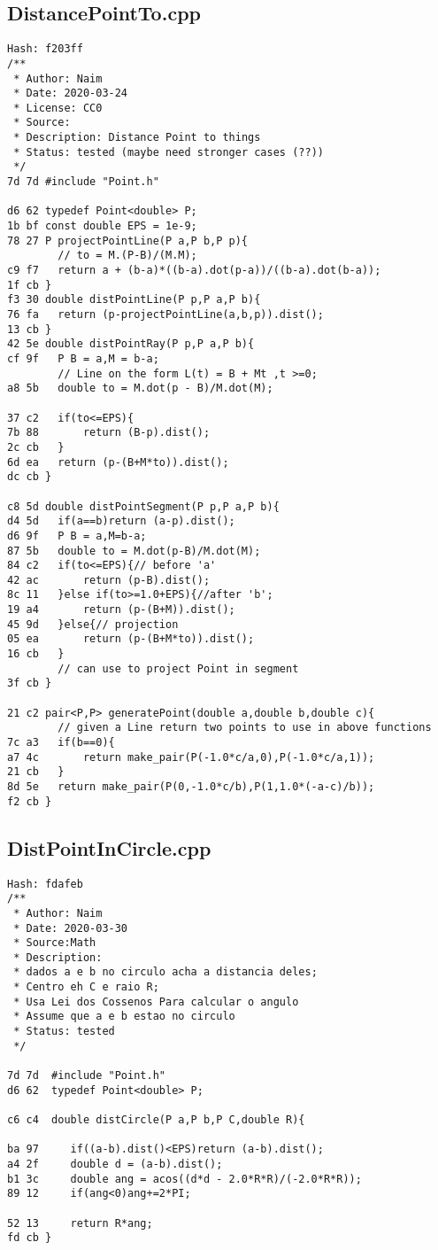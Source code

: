 \documentclass[11pt, a4paper, twoside]{article}
\begin{document}
\subsection{DistancePointTo.cpp}
\begin{lstlisting}
Hash: f203ff
/**
 * Author: Naim
 * Date: 2020-03-24
 * License: CC0
 * Source:
 * Description: Distance Point to things
 * Status: tested (maybe need stronger cases (??))
 */
7d 7d #include "Point.h"

d6 62 typedef Point<double> P;
1b bf const double EPS = 1e-9;
78 27 P projectPointLine(P a,P b,P p){
      	// to = M.(P-B)/(M.M);
c9 f7 	return a + (b-a)*((b-a).dot(p-a))/((b-a).dot(b-a));
1f cb }
f3 30 double distPointLine(P p,P a,P b){
76 fa 	return (p-projectPointLine(a,b,p)).dist();
13 cb }
42 5e double distPointRay(P p,P a,P b){
cf 9f 	P B = a,M = b-a;
      	// Line on the form L(t) = B + Mt ,t >=0;
a8 5b 	double to = M.dot(p - B)/M.dot(M);
      	
37 c2 	if(to<=EPS){
7b 88 		return (B-p).dist();
2c cb 	}
6d ea 	return (p-(B+M*to)).dist();
dc cb }

c8 5d double distPointSegment(P p,P a,P b){
d4 5d 	if(a==b)return (a-p).dist();
d6 9f 	P B = a,M=b-a;
87 5b 	double to = M.dot(p-B)/M.dot(M);
84 c2 	if(to<=EPS){// before 'a'
42 ac 		return (p-B).dist();
8c 11 	}else if(to>=1.0+EPS){//after 'b'; 
19 a4 		return (p-(B+M)).dist();
45 9d 	}else{// projection
05 ea 		return (p-(B+M*to)).dist();
16 cb 	}
      	// can use to project Point in segment
3f cb }

21 c2 pair<P,P> generatePoint(double a,double b,double c){
        // given a Line return two points to use in above functions
7c a3 	if(b==0){
a7 4c 		return make_pair(P(-1.0*c/a,0),P(-1.0*c/a,1));
21 cb 	}
8d 5e 	return make_pair(P(0,-1.0*c/b),P(1,1.0*(-a-c)/b));
f2 cb }
\end{lstlisting}

\subsection{DistPointInCircle.cpp}
\begin{lstlisting}
Hash: fdafeb
/**
 * Author: Naim
 * Date: 2020-03-30
 * Source:Math
 * Description:
 * dados a e b no circulo acha a distancia deles;
 * Centro eh C e raio R;
 * Usa Lei dos Cossenos Para calcular o angulo
 * Assume que a e b estao no circulo
 * Status: tested 
 */
 
7d 7d  #include "Point.h"
d6 62  typedef Point<double> P;
 
c6 c4  double distCircle(P a,P b,P C,double R){
      
ba 97     if((a-b).dist()<EPS)return (a-b).dist();
a4 2f     double d = (a-b).dist();
b1 3c     double ang = acos((d*d - 2.0*R*R)/(-2.0*R*R));
89 12     if(ang<0)ang+=2*PI;
          
52 13     return R*ang;
fd cb }
\end{lstlisting}
\end{document}
